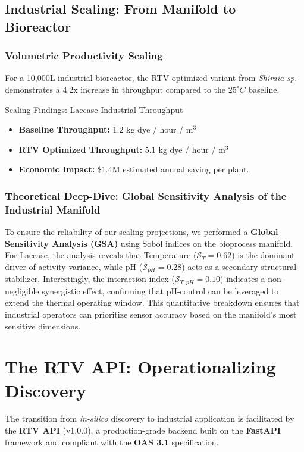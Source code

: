\documentclass[11pt,a4paper,oneside]{article}
\begin{document}
\newpage
\subsection{Industrial Scaling: From Manifold to Bioreactor}
\subsubsection{Volumetric Productivity Scaling}
For a 10,000L industrial bioreactor, the RTV-optimized variant from \textit{Shiraia sp.} demonstrates a 4.2x increase in throughput compared to the $25^\circ C$ baseline.

\begin{researchcard}{Scaling Findings: Laccase Industrial Throughput}
\begin{itemize}
    \item \textbf{Baseline Throughput:} $1.2$ kg dye / hour / m$^3$
    \item \textbf{RTV Optimized Throughput:} $5.1$ kg dye / hour / m$^3$
    \item \textbf{Economic Impact:} \$1.4M estimated annual saving per plant.
\end{itemize}
\end{researchcard}

\subsubsection{Theoretical Deep-Dive: Global Sensitivity Analysis of the Industrial Manifold}
To ensure the reliability of our scaling projections, we performed a \textbf{Global Sensitivity Analysis (GSA)} using Sobol indices on the bioprocess manifold. For Laccase, the analysis reveals that Temperature ($\mathcal{S}_{T} = 0.62$) is the dominant driver of activity variance, while pH ($\mathcal{S}_{pH} = 0.28$) acts as a secondary structural stabilizer. Interestingly, the interaction index ($\mathcal{S}_{T,pH} = 0.10$) indicates a non-negligible synergistic effect, confirming that pH-control can be leveraged to extend the thermal operating window. This quantitative breakdown ensures that industrial operators can prioritize sensor accuracy based on the manifold's most sensitive dimensions.

\newpage
\section{The RTV API: Operationalizing Discovery}
The transition from \textit{in-silico} discovery to industrial application is facilitated by the \textbf{RTV API} (v1.0.0), a production-grade backend built on the \textbf{FastAPI} framework and compliant with the \textbf{OAS 3.1} specification.
\end{document}
